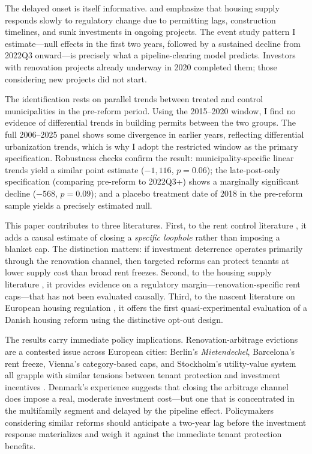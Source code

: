 \documentclass[12pt]{article}
\begin{document}
The delayed onset is itself informative. \citet{mayer2021} and \citet{muellbauer2012} emphasize that housing supply responds slowly to regulatory change due to permitting lags, construction timelines, and sunk investments in ongoing projects. The event study pattern I estimate---null effects in the first two years, followed by a sustained decline from 2022Q3 onward---is precisely what a pipeline-clearing model predicts. Investors with renovation projects already underway in 2020 completed them; those considering new projects did not start.

The identification rests on parallel trends between treated and control municipalities in the pre-reform period. Using the 2015--2020 window, I find no evidence of differential trends in building permits between the two groups. The full 2006--2025 panel shows some divergence in earlier years, reflecting differential urbanization trends, which is why I adopt the restricted window as the primary specification. Robustness checks confirm the result: municipality-specific linear trends yield a similar point estimate ($-1,116$, $p = 0.06$); the late-post-only specification (comparing pre-reform to 2022Q3+) shows a marginally significant decline ($-568$, $p = 0.09$); and a placebo treatment date of 2018 in the pre-reform sample yields a precisely estimated null.

This paper contributes to three literatures. First, to the rent control literature \citep{arnott1995,diamond2019,autor2014,glaeser2003,svensson2022}, it adds a causal estimate of closing a \emph{specific loophole} rather than imposing a blanket cap. The distinction matters: if investment deterrence operates primarily through the renovation channel, then targeted reforms can protect tenants at lower supply cost than broad rent freezes. Second, to the housing supply literature \citep{glaeser2005,saiz2010,hilber2016,murphy2018}, it provides evidence on a regulatory margin---renovation-specific rent caps---that has not been evaluated causally. Third, to the nascent literature on European housing regulation \citep{kholodilin2020,breidenbach2022,mense2023,koenig2024}, it offers the first quasi-experimental evaluation of a Danish housing reform using the distinctive opt-out design.

The results carry immediate policy implications. Renovation-arbitrage evictions are a contested issue across European cities: Berlin's \emph{Mietendeckel}, Barcelona's rent freeze, Vienna's category-based caps, and Stockholm's utility-value system all grapple with similar tensions between tenant protection and investment incentives \citep{breidenbach2022,koenig2024}. Denmark's experience suggests that closing the arbitrage channel does impose a real, moderate investment cost---but one that is concentrated in the multifamily segment and delayed by the pipeline effect. Policymakers considering similar reforms should anticipate a two-year lag before the investment response materializes and weigh it against the immediate tenant protection benefits.
\end{document}
